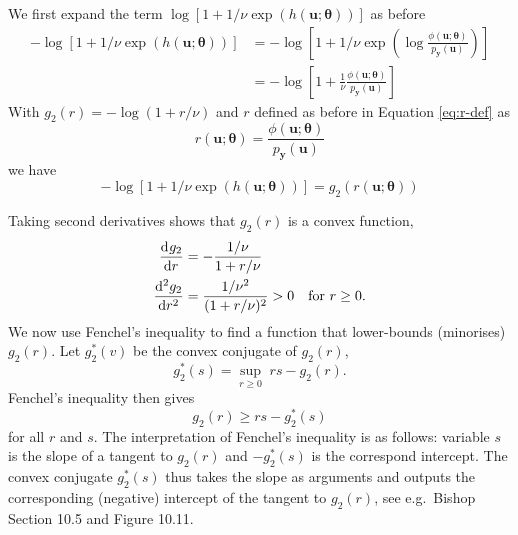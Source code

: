 \documentclass[11pt, oneside]{article}
\newcommand{\thetab}{{\boldsymbol{\theta}}}
\newcommand{\pnn}{\phi}
\newcommand{\pnoise}{p_{ \mathbf y}}
\renewcommand{\u}{{\mathbf u}}
\begin{document}
We first expand the term $ \log \left[1+1/\nu \exp(h(\u;\thetab))\right]$ as before
\begin{align}
  - \log [1+1/\nu \exp(h(\u;\thetab))] & =  - \log \left[1+1/\nu \exp \left( \log \frac{\pnn(\u;\thetab)}{\pnoise(\u)}\right) \right]\\
  & =  - \log \left[1+\frac{1}{\nu} \frac{\pnn(\u;\thetab)}{\pnoise(\u)}  \right] 
\end{align}
With $g_2(r) = -\log(1+r/\nu)$ and $r$ defined as before in Equation
\eqref{eq:r-def} as 
\begin{equation}
  r(\u;\thetab) = \frac{\pnn(\u;\thetab)}{\pnoise(\u)}
\end{equation}
we have
\begin{equation}
  - \log [1+1/\nu \exp(h(\u;\thetab))] = g_2(r(\u;\thetab))
\end{equation}

Taking second derivatives shows that $g_2(r)$ is a convex function,
\begin{align}
  \dod{g_2}{r} & = -\frac{1/\nu}{1+r/\nu}\\
  \dod[2]{g_2}{r} & = \frac{1/\nu^2}{(1+r/\nu )^2} >0 \quad \text{for } r\ge 0.
\end{align}
We now use Fenchel's inequality to find a function that lower-bounds (minorises) $g_2(r)$. Let $g_2^*(v)$ be the convex conjugate of $g_2(r)$,
\begin{equation}
  g_2^*(s) = \sup_{r\ge 0} \; rs - g_2(r).
\end{equation}
Fenchel's inequality then gives
\begin{equation}
  g_2(r) \ge r s - g_2^*(s)
\end{equation}
for all $r$ and $s$. The interpretation of Fenchel's inequality is as follows: variable $s$ is the slope of a tangent to $g_2(r)$ and $-g_2^*(s)$ is the correspond intercept. The convex conjugate $g_2^*(s)$ thus takes the slope as arguments and outputs the corresponding (negative) intercept of the tangent to $g_2(r)$, see e.g.\ Bishop Section 10.5 and Figure 10.11.
\end{document}
